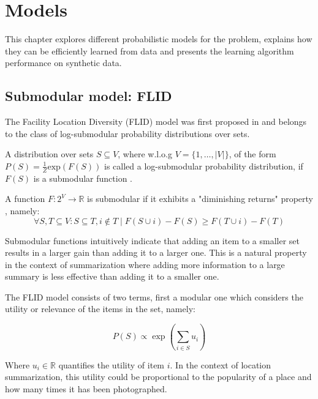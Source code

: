 \chapter{Models}
\label{sec:models}

This chapter explores different probabilistic models for the problem, explains how they can be efficiently learned from data and presents the learning algorithm performance on synthetic data.

\section{Submodular model: FLID}

The Facility Location Diversity (FLID) model was first proposed in \cite{tschiatschek16learning} and belongs to the class of log-submodular probability distributions over sets.

\begin{definition}
  A distribution over sets $S \subseteq V$, where w.l.o.g $V = \{1,\dots,|V|\}$, of the form $P(S) = \frac{1}{Z}\mathrm{exp}(F(S))$ is called a log-submodular probability distribution, if $F(S)$ is a submodular function \cite{djolonga14variational}.
\end{definition}

\begin{definition}
  \label{def:submodularity}
  A function $F:2^V \rightarrow \mathbb{R}$ is submodular if it exhibits a "diminishing returns" property \cite{krause14submodular}, namely:
    \begin{equation*}
      \forall S,T \subseteq V : S \subseteq T, i \notin T \mid F(S \cup i) - F(S) \geq F(T \cup i) - F(T)
    \end{equation*}
\end{definition}

Submodular functions intuitively indicate that adding an item to a smaller set results in a larger gain than adding it to a larger one. This is a natural property in the context of summarization where adding more information to a large summary is less effective than adding it to a smaller one.

The FLID model consists of two terms, first a modular one which considers the utility or relevance of the items in the set, namely:

\begin{equation}
  P(S) \propto \exp\left(\sum_{i \in S}u_{i}\right)
\end{equation}

Where $u_{i} \in \mathbb{R}$ quantifies the utility of item $i$. In the context of location summarization, this utility could be proportional to the popularity of a place and how many times it has been photographed.

